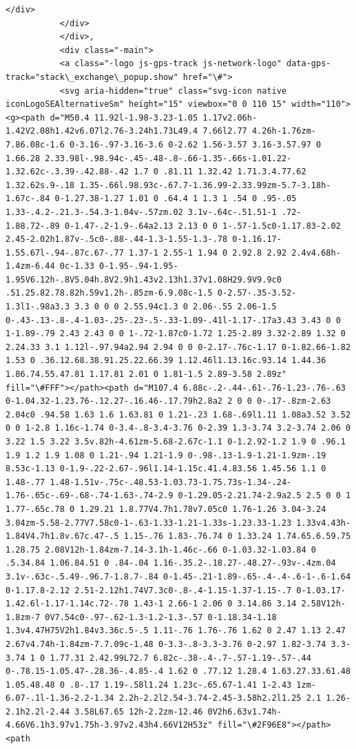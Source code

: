 \documentclass[11pt]{article}
\begin{document}
\begin{Verbatim}[commandchars=\\\{\}]
           </div>
           </div>
           </div>,
           <div class="-main">
           <a class="-logo js-gps-track js-network-logo" data-gps-track="stack\_exchange\_popup.show" href="\#">
           <svg aria-hidden="true" class="svg-icon native iconLogoSEAlternativeSm" height="15" viewbox="0 0 110 15" width="110"><g><path d="M50.4 11.92l-1.98-3.23-1.05 1.17v2.06h-1.42V2.08h1.42v6.07l2.76-3.24h1.73L49.4 7.66l2.77 4.26h-1.76zm-7.86.08c-1.6 0-3.16-.97-3.16-3.6 0-2.62 1.56-3.57 3.16-3.57.97 0 1.66.28 2.33.98l-.98.94c-.45-.48-.8-.66-1.35-.66s-1.01.22-1.32.62c-.3.39-.42.88-.42 1.7 0 .81.11 1.32.42 1.71.3.4.77.62 1.32.62s.9-.18 1.35-.66l.98.93c-.67.7-1.36.99-2.33.99zm-5.7-3.18h-1.67c-.84 0-1.27.38-1.27 1.01 0 .64.4 1 1.3 1 .54 0 .95-.05 1.33-.4.2-.21.3-.54.3-1.04v-.57zm.02 3.1v-.64c-.51.51-1 .72-1.88.72-.89 0-1.47-.2-1.9-.64a2.13 2.13 0 0 1-.57-1.5c0-1.17.83-2.02 2.45-2.02h1.87v-.5c0-.88-.44-1.3-1.55-1.3-.78 0-1.16.17-1.55.67l-.94-.87c.67-.77 1.37-1 2.55-1 1.94 0 2.92.8 2.92 2.4v4.68h-1.4zm-6.44 0c-1.33 0-1.95-.94-1.95-1.95V6.12h-.8V5.04h.8V2.9h1.43v2.13h1.37v1.08H29.9V9.9c0 .51.25.82.78.82h.59v1.2h-.85zm-6.9.08c-1.5 0-2.57-.35-3.52-1.3l1-.98a3.3 3.3 0 0 0 2.55.94c1.3 0 2.06-.55 2.06-1.5 0-.43-.13-.8-.4-1.03-.25-.23-.5-.33-1.09-.41l-1.17-.17a3.43 3.43 0 0 1-1.89-.79 2.43 2.43 0 0 1-.72-1.87c0-1.72 1.25-2.89 3.32-2.89 1.32 0 2.24.33 3.1 1.12l-.97.94a2.94 2.94 0 0 0-2.17-.76c-1.17 0-1.82.66-1.82 1.53 0 .36.12.68.38.91.25.22.66.39 1.12.46l1.13.16c.93.14 1.44.36 1.86.74.55.47.81 1.17.81 2.01 0 1.81-1.5 2.89-3.58 2.89z" fill="\#FFF"></path><path d="M107.4 6.88c-.2-.44-.61-.76-1.23-.76-.63 0-1.04.32-1.23.76-.12.27-.16.46-.17.79h2.8a2 2 0 0 0-.17-.8zm-2.63 2.04c0 .94.58 1.63 1.6 1.63.81 0 1.21-.23 1.68-.69l1.11 1.08a3.52 3.52 0 0 1-2.8 1.16c-1.74 0-3.4-.8-3.4-3.76 0-2.39 1.3-3.74 3.2-3.74 2.06 0 3.22 1.5 3.22 3.5v.82h-4.61zm-5.68-2.67c-1.1 0-1.2.92-1.2 1.9 0 .96.1 1.9 1.2 1.9 1.08 0 1.21-.94 1.21-1.9 0-.98-.13-1.9-1.21-1.9zm-.19 8.53c-1.13 0-1.9-.22-2.67-.96l1.14-1.15c.41.4.83.56 1.45.56 1.1 0 1.48-.77 1.48-1.51v-.75c-.48.53-1.03.73-1.75.73s-1.34-.24-1.76-.65c-.69-.68-.74-1.63-.74-2.9 0-1.29.05-2.21.74-2.9a2.5 2.5 0 0 1 1.77-.65c.78 0 1.29.21 1.8.77V4.7h1.78v7.05c0 1.76-1.26 3.04-3.24 3.04zm-5.58-2.77V7.58c0-1-.63-1.33-1.21-1.33s-1.23.33-1.23 1.33v4.43h-1.84V4.7h1.8v.67c.47-.5 1.15-.76 1.83-.76.74 0 1.33.24 1.74.65.6.59.75 1.28.75 2.08V12h-1.84zm-7.14-3.1h-1.46c-.66 0-1.03.32-1.03.84 0 .5.34.84 1.06.84.51 0 .84-.04 1.16-.35.2-.18.27-.48.27-.93v-.4zm.04 3.1v-.63c-.5.49-.96.7-1.8.7-.84 0-1.45-.21-1.89-.65-.4-.4-.6-1-.6-1.64 0-1.17.8-2.12 2.51-2.12h1.74V7.3c0-.8-.4-1.15-1.37-1.15-.7 0-1.03.17-1.42.6l-1.17-1.14c.72-.78 1.43-1 2.66-1 2.06 0 3.14.86 3.14 2.58V12h-1.8zm-7 0V7.54c0-.97-.62-1.3-1.2-1.3-.57 0-1.18.34-1.18 1.3v4.47H75V2h1.84v3.36c.5-.5 1.11-.76 1.76-.76 1.62 0 2.47 1.13 2.47 2.67v4.74h-1.84zm-7.7.09c-1.48 0-3.3-.8-3.3-3.76 0-2.97 1.82-3.74 3.3-3.74 1 0 1.77.31 2.42.99L72.7 6.82c-.38-.4-.7-.57-1.19-.57-.44 0-.78.15-1.05.47-.28.36-.4.85-.4 1.62 0 .77.12 1.28.4 1.63.27.33.61.48 1.05.48.48 0 .8-.17 1.19-.58l1.24 1.23c-.65.67-1.41 1-2.43 1zm-6.07-.1l-1.36-2.2-1.34 2.2h-2.2l2.54-3.74-2.45-3.58h2.2l1.25 2.1 1.26-2.1h2.2l-2.44 3.58L67.65 12h-2.2zm-12.46 0V2h6.63v1.74h-4.66V6.1h3.97v1.75h-3.97v2.43h4.66V12H53z" fill="\#2F96E8"></path><path 
\end{Verbatim}
\end{document}

